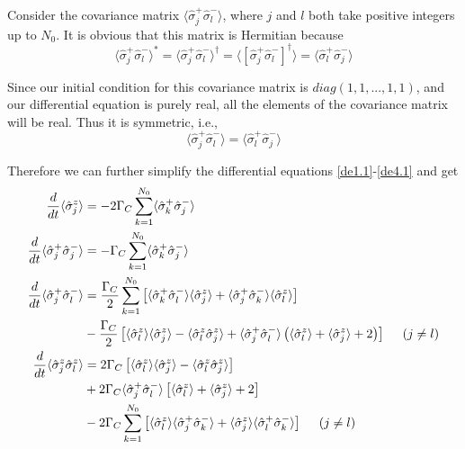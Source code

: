 \documentclass{article}
\newcommand{\gc}{\Gamma_C}
\begin{document}
Consider the covariance matrix $\langle\hat{\sigma}^+_j\hat{\sigma}^-_l\rangle$, where $j$ and $l$ both take positive integers up to $N_0$. It is obvious that this matrix is Hermitian because
\begin{equation}
    \langle\hat{\sigma}^+_j\hat{\sigma}^-_l\rangle^\ast = \langle\hat{\sigma}^+_j\hat{\sigma}^-_l\rangle^\dagger =\langle\left[\hat{\sigma}^+_j\hat{\sigma}^-_l\right]^\dagger\rangle=\langle\hat{\sigma}^+_l\hat{\sigma}^-_j\rangle
\end{equation}

Since our initial condition for this covariance matrix is $diag(1,1,...,1,1)$, and our differential equation is purely real, all the elements of the covariance matrix will be real. Thus it is symmetric, i.e., 
\begin{equation}
    \langle\hat{\sigma}^+_j\hat{\sigma}^-_l\rangle = \langle\hat{\sigma}^+_l\hat{\sigma}^-_j\rangle
\end{equation}

Therefore we can further simplify the differential equations \ref{de1.1}-\ref{de4.1} and get
\begin{align}
\frac{d}{dt}\langle\hat{\sigma}^z_j\rangle&=-2\gc\sum_{k=1}^{N_0}\langle\hat{\sigma}_k^+\hat{\sigma}^-_j\rangle\\
\frac{d}{dt}\langle\hat{\sigma}^+_j\hat{\sigma}^-_j\rangle&=-\gc\sum_{k=1}^{N_0}\langle\hat{\sigma}_k^+\hat{\sigma}^-_j\rangle\\\notag
\frac{d}{dt}\langle\hat{\sigma}^+_j\hat{\sigma}^-_l\rangle&=\frac{\gc}{2}\sum_{k=1}^{N_0}\left[\langle\hat{\sigma}_k^+\hat{\sigma}_l^-\rangle \langle \hat{\sigma}_j^z\rangle+\langle\hat{\sigma}^+_j\hat{\sigma}_k^-\rangle \langle \hat{\sigma}_l^z\rangle\right]\\
&-\frac{\gc}{2}\left[\langle\hat{\sigma}_l^z\rangle \langle \hat{\sigma}_j^z\rangle-\langle\hat{\sigma}_l^z \hat{\sigma}_j^z\rangle
+\langle\hat{\sigma}_j^+ \hat{\sigma}_l^-\rangle\left(\langle\hat{\sigma}_l^z\rangle +\langle \hat{\sigma}_j^z\rangle+2\right)\right]\ \ \ \ (j\neq l)\\\notag
\frac{d}{dt}\langle\hat{\sigma}_j^z \hat{\sigma}_l^z\rangle&=2\gc\left[\langle\hat{\sigma}_l^z\rangle \langle \hat{\sigma}_j^z\rangle-\langle\hat{\sigma}_l^z \hat{\sigma}_j^z\rangle\right]\\\notag
&+2\gc\langle\hat{\sigma}_j^+\hat{\sigma}_l^-\rangle\left[\langle\hat{\sigma}_l^z\rangle+\langle \hat{\sigma}_j^z\rangle+2\right]\\
&-2\gc\sum_{k=1}^{N_0}\left[\langle\hat{\sigma}_l^z\rangle\langle\hat{\sigma}_j^+\hat{\sigma}_k^-\rangle+\langle\hat{\sigma}_j^z\rangle\langle\hat{\sigma}_l^+\hat{\sigma}_k^-\rangle\right]\ \ \ \ (j\neq l)
\end{align}
\end{document}
